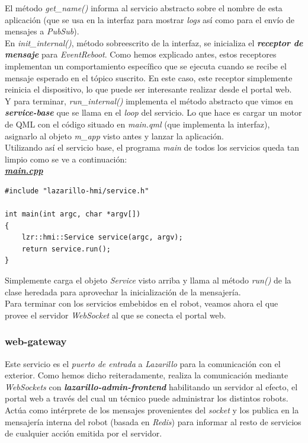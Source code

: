 El método \emph{get\_name()} informa al servicio abstracto sobre el nombre de esta aplicación (que se usa en la interfaz para mostrar \textit{logs} así como para el envío de mensajes a \textit{PubSub}).\\

En \emph{init\_internal()}, método sobreescrito de la interfaz, se inicializa el \textbf{\textit{receptor de mensaje}} para \emph{EventReboot}. Como hemos explicado antes, estos receptores implementan un comportamiento específico que se ejecuta cuando se recibe el mensaje esperado en el tópico suscrito. En este caso, este receptor simplemente reinicia el dispositivo, lo que puede ser interesante realizar desde el portal web.\\

Y para terminar, \emph{run\_internal()} implementa el método abstracto que vimos en \textbf{\textit{service-base}} que se llama en el \textit{loop} del servicio. Lo que hace es cargar un motor de QML con el código situado en \emph{main.qml} (que implementa la interfaz), asignarlo al objeto \emph{m\_app} visto antes y lanzar la aplicación.\\

Utilizando así el servicio base, el programa \textit{main} de todos los servicios queda tan limpio como se ve a continuación:\\

\textbf{\textit{\href{https://github.com/adrianmorente/lazarillo-embedded/blob/master/lazarillo-hmi/src/main.cpp}{main.cpp}}} 
\begin{lstlisting}
#include "lazarillo-hmi/service.h"

int main(int argc, char *argv[])
{
	lzr::hmi::Service service(argc, argv);
	return service.run();
}
\end{lstlisting}

Simplemente carga el objeto \emph{Service} visto arriba y llama al método \emph{run()} de la clase heredada para aprovechar la inicialización de la mensajería.\\

Para terminar con los servicios embebidos en el robot, veamos ahora el que provee el servidor \textit{WebSocket} al que se conecta el portal web.\\

\subsubsection{web-gateway}

Este servicio es el \textit{puerto de entrada} a \textit{Lazarillo} para la comunicación con el exterior. Como hemos dicho reiteradamente, realiza la comunicación mediante \textit{WebSockets} con \textbf{\textit{lazarillo-admin-frontend}} habilitando un servidor al efecto, el portal web a través del cual un técnico puede administrar los distintos robots. Actúa como intérprete de los mensajes provenientes del \textit{socket} y los publica en la mensajería interna del robot (basada en \textit{Redis}) para informar al resto de servicios de cualquier acción emitida por el servidor.\\


